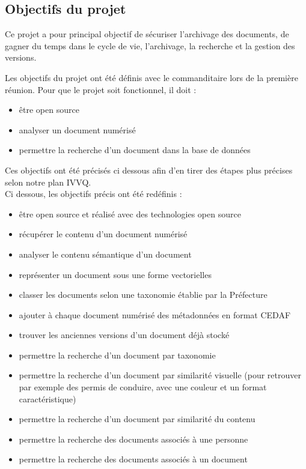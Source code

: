 
\subsection {Objectifs du projet}
Ce projet a pour principal objectif de sécuriser l'archivage des documents, de gagner du temps dans le cycle de vie, l'archivage, la recherche et la gestion des versions.


Les objectifs du projet ont été définis avec le commanditaire lors de la première réunion.
Pour que le projet soit fonctionnel, il doit :
\begin {itemize}
\item être open source
\item analyser un document numérisé
\item permettre la recherche d'un document dans la base de données
\newline
\end {itemize}
Ces objectifs ont été précisés ci dessous afin d'en tirer des étapes plus précises selon notre plan IVVQ. \\ 

Ci dessous, les objectifs précis ont été redéfinis :
\begin {itemize}
\item être open source et réalisé avec des technologies open source
\item récupérer le contenu d'un document numérisé
\item analyser le contenu sémantique d’un document
\item représenter un document sous une forme vectorielles
\item classer les documents selon une taxonomie établie par la Préfecture
\item ajouter à chaque document numérisé des métadonnées en format CEDAF
\item trouver les anciennes versions d’un document déjà stocké
\item permettre la recherche d’un document par taxonomie
\item permettre la recherche d’un document par similarité visuelle (pour retrouver par exemple des permis de conduire, avec une couleur et un format caractéristique)
\item permettre la recherche d’un document par similarité du contenu
\item permettre la recherche des documents associés à une personne
\item permettre la recherche des documents associés à un document
\\
\end {itemize}

